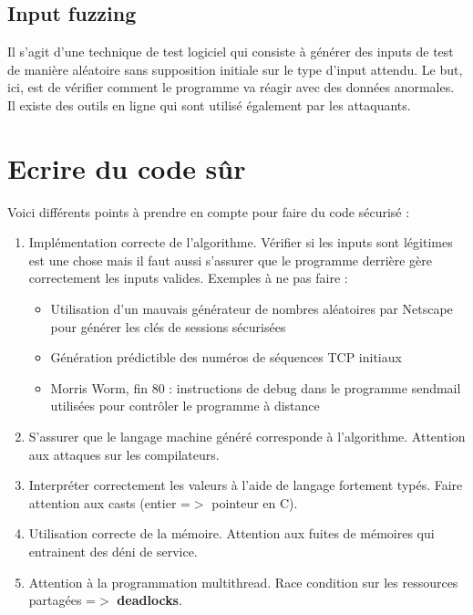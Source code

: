 \documentclass{report}
\begin{document}
\subsection{Input fuzzing}

Il s'agit d'une technique de test logiciel qui consiste à générer des inputs de test de manière aléatoire sans supposition initiale sur le type d'input attendu. Le but, ici, est de vérifier comment le programme va réagir avec des données anormales. \\
Il existe des outils en ligne qui sont utilisé également par les attaquants.

\section{Ecrire du code sûr}

Voici différents points à prendre en compte pour faire du code sécurisé :

\begin{enumerate}
    \item Implémentation correcte de l'algorithme. Vérifier si les inputs sont légitimes est une chose mais il faut aussi s'assurer que le programme derrière gère correctement les inputs valides. Exemples à ne pas faire :
    \begin{itemize}
        \item Utilisation d’un mauvais générateur de nombres aléatoires par Netscape pour générer les clés de sessions sécurisées
        \item Génération prédictible des numéros de séquences TCP initiaux
        \item Morris Worm, fin 80 : instructions de debug dans le programme sendmail utilisées pour contrôler le programme à distance
    \end{itemize}

    \item S'assurer que le langage machine généré corresponde à l'algorithme. Attention aux attaques sur les compilateurs.

    \item Interpréter correctement les valeurs à l'aide de langage fortement typés. Faire attention aux casts (entier =$>$ pointeur en C).

    \item Utilisation correcte de la mémoire. Attention aux fuites de mémoires qui entrainent des déni de service.

    \item Attention à la programmation multithread. Race condition sur les ressources partagées =$>$ \textbf{deadlocks}.
\end{enumerate}
\end{document}
